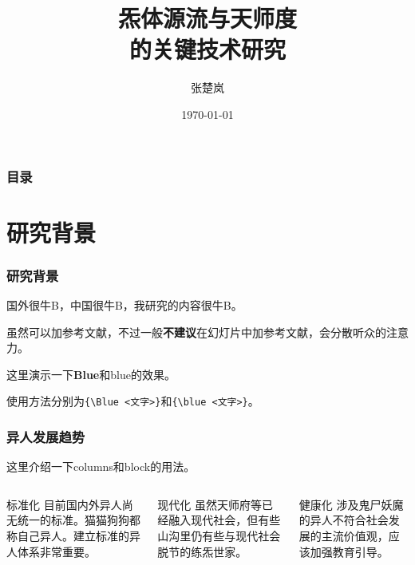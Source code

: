 \documentclass[10pt]{beamer}	%
\newcommand{\Blue}{\bfseries \color{njuPurple}}
\newcommand{\blue}{\color{njuPurple}}
\begin{document}
\title[炁体源流与天师度]{炁体源流与天师度\\的关键技术研究}	%
\author{张楚岚}
\date{\today}

\frame{\titlepage}

\begin{frame}
\frametitle{目录}
\makecontents
\end{frame}

\section{研究背景}
\begin{frame}[fragile]
\frametitle{研究背景}
国外很牛B，中国很牛B，我研究的内容很牛B。\cite{wootters1982single}

虽然可以加参考文献，不过一般{\Blue 不建议}在幻灯片中加参考文献，会分散听众的注意力。

这里演示一下{\Blue Blue}和{\blue blue}的效果。

使用方法分别为\verb|{\Blue <文字>}|和\verb|{\blue <文字>}|。
\end{frame}

\begin{frame}
\frametitle{异人发展趋势}
这里介绍一下columns和block的用法。
\begin{columns}[t]
\begin{column}{0.33\textwidth}
\begin{block}{标准化}
目前国内外异人尚无统一的标准。猫猫狗狗都称自己异人。建立标准的异人体系非常重要。
\end{block}
\end{column}
\begin{column}{0.33\textwidth}
\begin{block}{现代化}
虽然天师府等已经融入现代社会，但有些山沟里仍有些与现代社会脱节的练炁世家。
\end{block}
\end{column}
\begin{column}{0.33\textwidth}
\begin{block}{健康化}
涉及鬼尸妖魔的异人不符合社会发展的主流价值观，应该加强教育引导。
\end{block}
\end{column}
\end{columns}
\end{frame}
\end{document}
